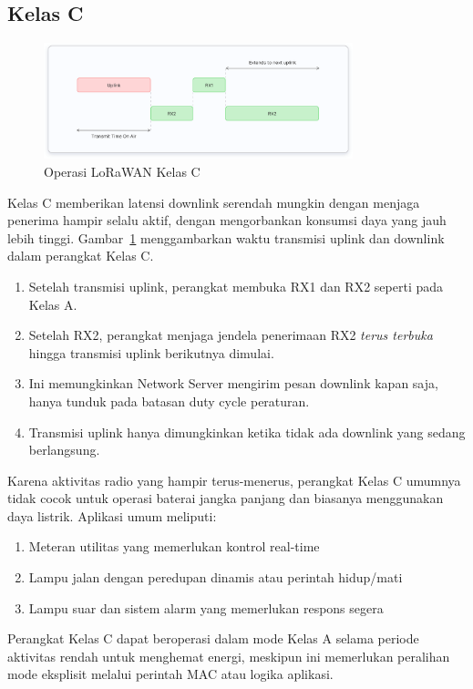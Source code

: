 \subsection{Kelas C}
\begin{figure}
    \centering
    \includegraphics[width=0.8\textwidth]{figures/class-c.png}
    \caption{Operasi LoRaWAN Kelas C}
    \label{fig:lora_class_c}
\end{figure}
Kelas C memberikan latensi downlink serendah mungkin dengan menjaga penerima hampir selalu aktif, dengan mengorbankan konsumsi daya yang jauh lebih tinggi.
Gambar~\ref{fig:lora_class_c} menggambarkan waktu transmisi uplink dan downlink dalam perangkat Kelas C.
\begin{enumerate}
    \item Setelah transmisi uplink, perangkat membuka RX1 dan RX2 seperti pada Kelas A.
    \item Setelah RX2, perangkat menjaga jendela penerimaan RX2 \emph{terus terbuka} hingga transmisi uplink berikutnya dimulai.
    \item Ini memungkinkan Network Server mengirim pesan downlink kapan saja, hanya tunduk pada batasan duty cycle peraturan.
    \item Transmisi uplink hanya dimungkinkan ketika tidak ada downlink yang sedang berlangsung.
\end{enumerate}
Karena aktivitas radio yang hampir terus-menerus, perangkat Kelas C umumnya tidak cocok untuk operasi baterai jangka panjang dan biasanya menggunakan daya listrik.
Aplikasi umum meliputi:
\begin{enumerate}
    \item Meteran utilitas yang memerlukan kontrol real-time
    \item Lampu jalan dengan peredupan dinamis atau perintah hidup/mati
    \item Lampu suar dan sistem alarm yang memerlukan respons segera
\end{enumerate}
Perangkat Kelas C dapat beroperasi dalam mode Kelas A selama periode aktivitas rendah untuk menghemat energi, meskipun ini memerlukan peralihan mode eksplisit melalui perintah MAC atau logika aplikasi.

